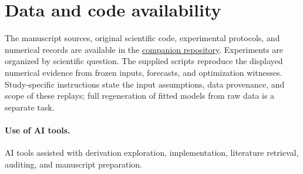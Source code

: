 \documentclass[twoside,11pt]{article}
\begin{document}
\section*{Data and code availability}
The manuscript sources, original scientific code, experimental protocols, and numerical records are available in the \href{https://github.com/MohitKumarRostock/Kernel_Affine_Hull_Koopman_Machine/tree/research/risk-certificates-consolidated-2026-11-08}{companion repository}. Experiments are organized by scientific question. The supplied scripts reproduce the displayed numerical evidence from frozen inputs, forecasts, and optimization witnesses. Study-specific instructions state the input assumptions, data provenance, and scope of these replays; full regeneration of fitted models from raw data is a separate task.
\paragraph{Use of AI tools.}
AI tools assisted with derivation exploration, implementation, literature retrieval, auditing, and manuscript preparation.

\appendix




\end{document}
